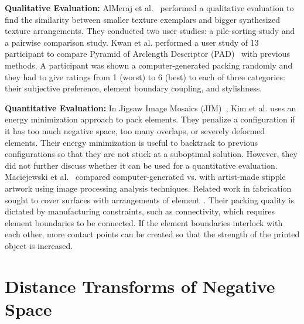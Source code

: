 \newtext
{
\textbf{Qualitative Evaluation:}
AlMeraj et al.~\cite{AlMerajEval2013} performed a qualitative evaluation to find
the similarity between smaller texture exemplars and bigger synthesized texture arrangements.
They conducted two user studies: a pile-sorting study and a pairwise comparison study.
Kwan et al. performed a user study of 13 participant to compare Pyramid of Arclength Descriptor (PAD)~\cite{Kwan2016} 
with previous methods.
A participant was shown a computer-generated packing randomly and they had to give ratings from 1 (worst) to 6 (best)
to each of three categories: their subjective preference, element boundary coupling, and stylishness.
}

\newtext
{
\textbf{Quantitative Evaluation:}
In Jigsaw Image Mosaics (JIM)~\cite{Kim2002}, Kim et al. uses an energy minimization approach
to pack elements. They penalize a configuration if it has too much negative space,
too many overlaps, or severely deformed elements. 
Their energy minimization is useful to backtrack to previous configurations 
so that they are not stuck at a suboptimal solution.
However, they did not further discuss whether it can be used for a quantitative evaluation.
Maciejewski et al.~\cite{Maciejewski2008} compared computer-generated vs.
with artist-made stipple artwork using image processing analysis techniques.
Related work in fabrication sought to cover surfaces with arrangements of element~\cite{Zehnder2016, Chen2017}.
Their packing quality is dictated by manufacturing constraints, such as connectivity, %
which requires element boundaries to be connected.
If the element boundaries interlock with each other, 
more contact points can be created so that the strength of the printed object is increased.}

\section{Distance Transforms of Negative Space}

